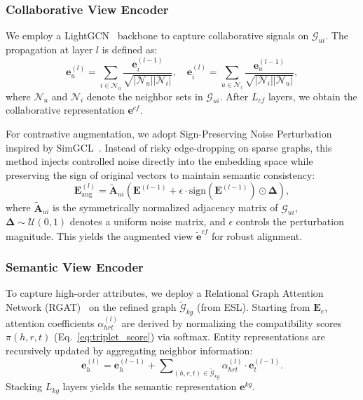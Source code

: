 \subsubsection{\textbf{Collaborative View Encoder}}
We employ a LightGCN~\cite{he2020lightgcn} backbone to capture collaborative signals on $\mathcal{G}_{ui}$. The propagation at layer $l$ is defined as:
\begin{equation}
	\mathbf{e}_u^{(l)} = \sum_{i \in \mathcal{N}_u} \frac{\mathbf{e}_i^{(l-1)}}{\sqrt{|\mathcal{N}_u| |\mathcal{N}_i|}}, \quad \mathbf{e}_i^{(l)} = \sum_{u \in \mathcal{N}_i} \frac{\mathbf{e}_u^{(l-1)}}{\sqrt{|\mathcal{N}_i| |\mathcal{N}_u|}},
\end{equation}
where $\mathcal{N}_u$ and $\mathcal{N}_i$ denote the neighbor sets in $\mathcal{G}_{ui}$. After $L_{cf}$ layers, we obtain the collaborative representation $\mathbf{e}^{cf}$.

For contrastive augmentation, we adopt Sign-Preserving Noise Perturbation inspired by SimGCL~\cite{yu2022graph}. Instead of risky edge-dropping on sparse graphs, this method injects controlled noise directly into the embedding space while preserving the sign of original vectors to maintain semantic consistency:
\begin{equation}
	\mathbf{E}^{(l)}_{\text{aug}} = \tilde{\mathbf{A}}_{ui} \left( \mathbf{E}^{(l-1)} + \epsilon \cdot \text{sign}(\mathbf{E}^{(l-1)}) \odot \boldsymbol{\Delta} \right),
\end{equation}
where $\tilde{\mathbf{A}}_{ui}$ is the symmetrically normalized adjacency matrix of $\mathcal{G}_{ui}$, $\boldsymbol{\Delta} \sim \mathcal{U}(0, 1)$ denotes a uniform noise matrix, and $\epsilon$ controls the perturbation magnitude. This yields the augmented view $\tilde{\mathbf{e}}^{cf}$ for robust alignment.

\subsubsection{\textbf{Semantic View Encoder}}
To capture high-order attributes, we deploy a Relational Graph Attention Network (RGAT)~\cite{yang2022knowledge,wang2019kgat} on the refined graph $\tilde{\mathcal{G}}_{kg}$ (from ESL). Starting from  $\mathbf{E}_e$, attention coefficients $\alpha_{hrt}^{(l)}$ are derived by normalizing the compatibility scores $\pi(h, r, t)$ (Eq.~\eqref{eq:triplet_score}) via softmax.
Entity representations are recursively updated by aggregating neighbor information:
\begin{equation}
	\mathbf{e}_h^{(l)} = \mathbf{e}_h^{(l-1)} + \sum\nolimits_{(h,r,t) \in \tilde{\mathcal{G}}_{kg}} \alpha_{hrt}^{(l)} \cdot \mathbf{e}_t^{(l-1)}.
\end{equation}
Stacking $L_{kg}$ layers yields the semantic representation $\mathbf{e}^{kg}$.

